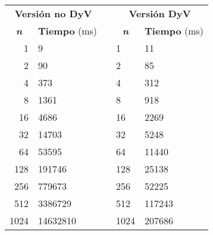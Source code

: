 \documentclass[10pt, a4paper]{article}
\theoremstyle{theorem-style}
\theoremstyle{theorem-style}
\theoremstyle{definition-style}
\theoremstyle{remark-style}
\theoremstyle{example-style}
\theoremstyle{definition-style}
\theoremstyle{remark-style}
\begin{document}
\begin{table}[h]
\centering
\begin{tabular}{|r|l|l|l|l|}
\cline{1-2} \cline{4-5}
\multicolumn{2}{c}{\cellcolor[HTML]{4DB6AC}\textbf{Versión no DyV}} & & \multicolumn{2}{c}{\cellcolor[HTML]{4DB6AC}\textbf{Versión DyV}} \\
\cline{1-2} \cline{4-5}
\multicolumn{1}{c}{\cellcolor[HTML]{80CBC4}\textbf{\emph{n}}} & \multicolumn{1}{c}{\cellcolor[HTML]{80CBC4}\textbf{Tiempo} (ms)} & & \multicolumn{1}{c}{\cellcolor[HTML]{80CBC4}\textbf{\emph{n}}} & \multicolumn{1}{c}{\cellcolor[HTML]{80CBC4}\textbf{Tiempo} (ms)}\\
\cline{1-2} \cline{4-5}
1 & 9 & & 1 & 11  \\
 2 & 90 & & 2 & 85  \\
 4 & 373 & & 4 & 312  \\
8 &  1361 & & 8 &  918\\
 16 & 4686 & & 16 & 2269  \\
 32 & 14703 & & 32 & 5248  \\
 64 & 53595 & & 64 & 11440  \\
128 & 191746 & & 128 & 25138  \\
 256 & 779673 & &  256 & 52225  \\
 512 & 3386729 & & 512 & 117243  \\
 1024 & 14632810 & & 1024 & 207686 \\
 \cline{1-2} \cline{4-5}

\end{tabular}
\end{table}
\end{document}
